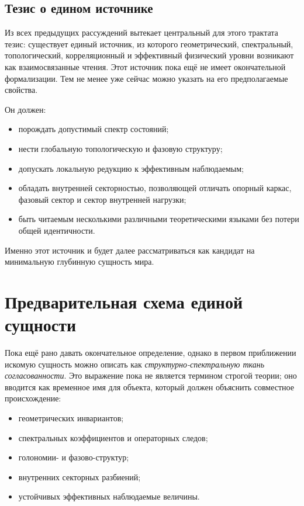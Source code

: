 \documentclass[12pt,a4paper]{article}
\begin{document}
\subsection{Тезис о едином источнике}

Из всех предыдущих рассуждений вытекает центральный для этого трактата тезис: существует единый источник, из которого геометрический, спектральный, топологический, корреляционный и эффективный физический уровни возникают как взаимосвязанные чтения. Этот источник пока ещё не имеет окончательной формализации. Тем не менее уже сейчас можно указать на его предполагаемые свойства.

Он должен:
\begin{itemize}
    \item порождать допустимый спектр состояний;
    \item нести глобальную топологическую и фазовую структуру;
    \item допускать локальную редукцию к эффективным наблюдаемым;
    \item обладать внутренней секторностью, позволяющей отличать опорный каркас, фазовый сектор и сектор внутренней нагрузки;
    \item быть читаемым несколькими различными теоретическими языками без потери общей идентичности.
\end{itemize}

Именно этот источник и будет далее рассматриваться как кандидат на минимальную глубинную сущность мира.

\section{Предварительная схема единой сущности}

Пока ещё рано давать окончательное определение, однако в первом приближении искомую сущность можно описать как \textit{структурно-спектральную ткань согласованности}. Это выражение пока не является термином строгой теории; оно вводится как временное имя для объекта, который должен объяснить совместное происхождение:
\begin{itemize}
    \item геометрических инвариантов;
    \item спектральных коэффициентов и операторных следов;
    \item голономии- и фазово-структур;
    \item внутренних секторных разбиений;
    \item устойчивых эффективных наблюдаемые величины.
\end{itemize}
\end{document}
